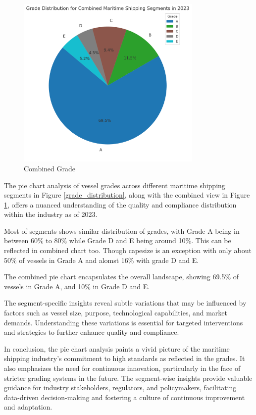 \begin{figure}[h]
    \centering
    \includegraphics[width=0.8\textwidth]{images/combined_grade.png}
    \caption{Combined Grade}
    \label{combined_grade}
\end{figure}

The pie chart analysis of vessel grades across different maritime shipping segments in Figure \ref{grade_distribution}, 
along with the combined view in Figure \ref{combined_grade}, offers a nuanced understanding of the quality and compliance distribution within the industry as of 2023.


Most of segments shows similar distribution of grades, with Grade A being in between 60\% to 80\% while Grade D and E being around 10\%.
This can be reflected in combined chart too. Though capesize is an exception with only about 50\% of vessels in Grade A and alomst 16\% with grade D and E.

The combined pie chart encapsulates the overall landscape, showing 69.5\% of vessels in Grade A, and 10\% in Grade D and E.

The segment-specific insights reveal subtle variations that may be influenced by factors such as vessel size, purpose, technological capabilities, and market demands. 
Understanding these variations is essential for targeted interventions and strategies to further enhance quality and compliance.

In conclusion, the pie chart analysis paints a vivid picture of the maritime shipping industry's commitment to high standards as reflected in the grades. 
It also emphasizes the need for continuous innovation, particularly in the face of stricter grading systems in the future. 
The segment-wise insights provide valuable guidance for industry stakeholders, regulators, and policymakers, facilitating data-driven decision-making and fostering a culture of continuous improvement and adaptation.


